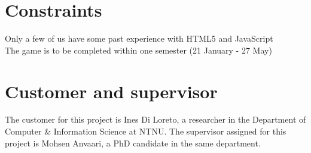 \section{Constraints}

Only a few of us have some past experience with HTML5 and JavaScript\\
The game is to be completed within one semester (21 January - 27 May)

\section{Customer and supervisor}
The customer for this project is Ines Di Loreto, a researcher in the Department 
of Computer \& Information Science at NTNU. The supervisor assigned for this 
project is Mohsen Anvaari, a PhD candidate in the same department.




